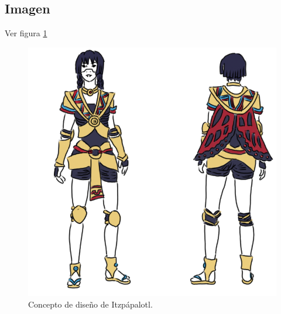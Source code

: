 \subsection{Imagen}
Ver figura \ref{fig:ItzpapalotlDiseno}
\begin{figure}
				\centering
				\includegraphics[height=0.3 \textheight]{Imagenes/Itzpapalotl}
				\caption{Concepto de diseño de Itzpápalotl.}
				\label{fig:ItzpapalotlDiseno}
\end{figure}
